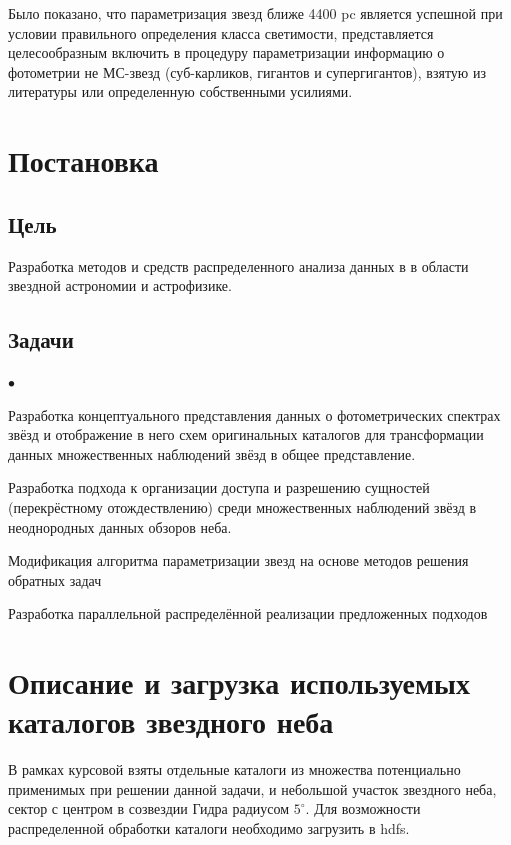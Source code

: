 \documentclass[12pt, a4paper]{article}
\newenvironment{compactlist}{
    \begin{list}{{$\bullet$}}{
      \setlength\partopsep{0pt}
      \setlength\parskip{0pt}
      \setlength\parsep{0pt}
      \setlength\topsep{0pt}
      \setlength\itemsep{0pt}
} }{
\end{list} }
\begin{document}
	Было показано, что параметризация звезд ближе 4400 pc является успешной при условии правильного определения класса светимости, представляется целесообразным включить в процедуру параметризации информацию о фотометрии не МС-звезд (суб-карликов, гигантов и супергигантов), взятую из литературы или определенную собственными усилиями.
	\section{Постановка}
	\subsection*{Цель}
	Разработка методов и средств распределенного анализа данных в в области звездной астрономии и астрофизике.
	\subsection*{Задачи}
	\begin{compactlist}
		\item Разработка концептуального представления данных о фотометрических спектрах звёзд и отображение в него схем оригинальных каталогов для трансформации данных множественных наблюдений звёзд в общее представление.
		\item Разработка подхода к организации доступа и разрешению сущностей (перекрёстному отождествлению) среди множественных наблюдений звёзд в неоднородных данных обзоров неба.
		\item Модификация алгоритма параметризации звезд на основе методов решения обратных задач
		\item Разработка параллельной распределённой реализации предложенных подходов
	\end{compactlist}
	\section{Описание и загрузка используемых каталогов звездного неба}
В рамках курсовой взяты отдельные каталоги из множества потенциально применимых при решении данной задачи, и небольшой участок звездного неба, сектор с центром в созвездии Гидра радиусом $5^{\circ}$. Для возможности распределенной обработки каталоги необходимо загрузить в hdfs.
\end{document}
